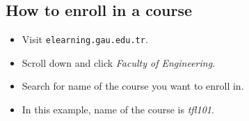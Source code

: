 \documentclass{article}
\begin{document}
\subsection{How to enroll in a course}

\begin{itemize}
	\item Visit \texttt{elearning.gau.edu.tr}.
	\item Scroll down and click \textit{Faculty of Engineering}.
\end{itemize}

\begin{figure}[H]
	\centering
\end{figure}

\begin{itemize}
	\item Search for name of the course you want to enroll in.
	\item In this example, name of the course is \textit{tfl101}.
\end{itemize}

\begin{figure}[H]
	\centering
\end{figure}
\end{document}
